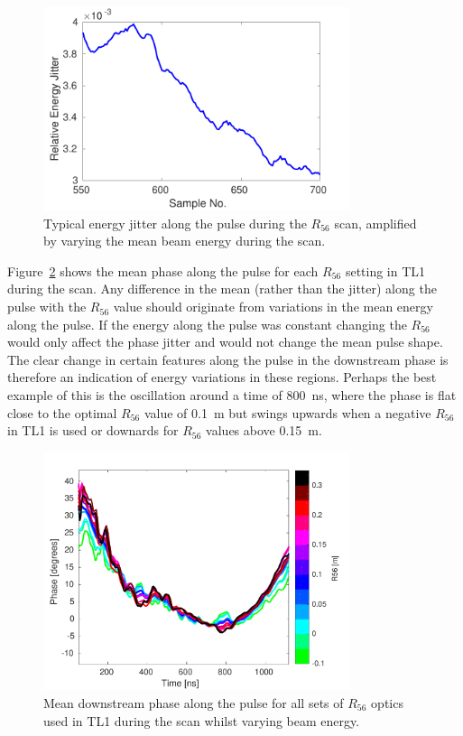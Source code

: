 \begin{figure}
  \centering
  \includegraphics[width=0.8\textwidth]{Figures/propagation/R56ScanGunWiggle_EnergyJitterAlong}
  \caption{Typical energy jitter along the pulse during the \(R_{56}\) scan, amplified by varying the mean beam energy during the scan.}
  \label{f:R56ScanGunWiggle_EnergyJitterAlong}
\end{figure}

Figure~\ref{f:r56Scan_meanPhaseAlong} shows the mean phase along the pulse for each \(R_{56}\) setting in TL1 during the scan. Any difference in the mean (rather than the jitter) along the pulse with the \(R_{56}\) value should originate from variations in the mean energy along the pulse. If the energy along the pulse was constant changing the \(R_{56}\) would only affect the phase jitter and would not change the mean pulse shape. The clear change in certain features along the pulse in the downstream phase is therefore an indication of energy variations in these regions. Perhaps the best example of this is the oscillation around a time of 800~ns, where the phase is flat close to the optimal \(R_{56}\) value of 0.1~m but swings upwards when a negative \(R_{56}\) in TL1 is used or downards for \(R_{56}\) values above 0.15~m.

\begin{figure}
  \centering
  \includegraphics[width=0.8\textwidth]{Figures/propagation/r56Scan_meanPhaseAlong}
  \caption{Mean downstream phase along the pulse for all sets of \(R_{56}\) optics used in TL1 during the scan whilst varying beam energy.}
  \label{f:r56Scan_meanPhaseAlong}
\end{figure}

